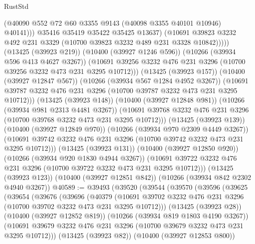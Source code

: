 \begin{lexlean}{RustStd}
\begin{coremodule}
                          (@40090 @552 @72 @60 @3355 @9143 (@40098 @3355 @40101 @10946) @40141)))
                      @35416
                      @35419
                      @35422
                      @35425
                      @13637)
                    (@10691
                      @39823
                      @3232
                      @492
                      @231
                      @3329
                      (@10700 @39823 @3232 @489 @231 @3328 @10842)))))
              (@13425 (@39923 @219))
              (@10400 (@39927 @1246 @596))
              (@10266 (@39934 @596 @413 @4627 @3267))
              (@10691 @39256 @3232 @476 @231 @3296 (@10700 @39256 @3232 @473 @231 @3295 @10712)))
            (@13425 (@39923 @157))
            (@10400 (@39927 @12847 @567))
            (@10266 (@39934 @567 @1284 @4952 @3267))
            (@10691 @39787 @3232 @476 @231 @3296 (@10700 @39787 @3232 @473 @231 @3295 @10712)))
          (@13425 (@39923 @148))
          (@10400 (@39927 @12848 @981))
          (@10266 (@39934 @981 @2313 @4481 @3267))
          (@10691 @39768 @3232 @476 @231 @3296 (@10700 @39768 @3232 @473 @231 @3295 @10712)))
        (@13425 (@39923 @139))
        (@10400 (@39927 @12849 @970))
        (@10266 (@39934 @970 @2309 @4449 @3267))
        (@10691 @39742 @3232 @476 @231 @3296 (@10700 @39742 @3232 @473 @231 @3295 @10712)))
      (@13425 (@39923 @131))
      (@10400 (@39927 @12850 @920))
      (@10266 (@39934 @920 @1830 @4944 @3267))
      (@10691 @39722 @3232 @476 @231 @3296 (@10700 @39722 @3232 @473 @231 @3295 @10712)))
    (@13425 (@39923 @123))
    (@10400 (@39927 @12851 @842))
    (@10266 (@39934 @842 @2302 @4940 @3267))
@40589 := @39493
    (@39520
      (@39544
        (@39570
          (@39596
            (@39625
              (@39654
                (@39676
                  (@39696
                    (@40379
                      (@10691
                        @39702
                        @3232
                        @476
                        @231
                        @3296
                        (@10700 @39702 @3232 @473 @231 @3295 @10712)))
                    (@13425 (@39923 @28))
                    (@10400 (@39927 @12852 @819))
                    (@10266 (@39934 @819 @1803 @4190 @3267))
                    (@10691
                      @39679
                      @3232
                      @476
                      @231
                      @3296
                      (@10700 @39679 @3232 @473 @231 @3295 @10712)))
                  (@13425 (@39923 @82))
                  (@10400 (@39927 @12853 @800))

\end{coremodule}
\end{lexlean}
